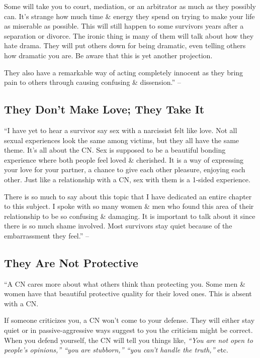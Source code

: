 \documentclass{article}
\numberwithin{equation}{section}
\begin{document}
Some will take you to court, mediation, or an arbitrator as much as they possibly can. It's strange how much time \& energy they spend on trying to make your life as miserable as possible. This will still happen to some survivors years after a separation or divorce. The ironic thing is many of them will talk about how they hate drama. They will put others down for being dramatic, even telling others how dramatic you are. Be aware that this is yet another projection.

They also have a remarkable way of acting completely innocent as they bring pain to others through causing confusing \& dissension.'' -- \cite[pp. 68--69]{Mirza2017}

\subsection{They Don't Make Love; They Take It}
``I have yet to hear a survivor say sex with a narcissist felt like love. Not all sexual experiences look the same among victims, but they all have the same theme. It's all about the CN. Sex is supposed to be a beautiful bonding experience where both people feel loved \& cherished. It is a way of expressing your love for your partner, a chance to give each other pleasure, enjoying each other. Just like a relationship with a CN, sex with them is a 1-sided experience.

There is so much to say about this topic that I have dedicated an entire chapter to this subject. I spoke with so many women \& men who found this area of their relationship to be so confusing \& damaging. It is important to talk about it since there is so much shame involved. Most survivors stay quiet because of the embarrassment they feel.'' -- \cite[p. 69]{Mirza2017}

\subsection{They Are Not Protective}
``A CN cares more about what others think than protecting you. Some men \& women have that beautiful protective quality for their loved ones. This is absent with a CN.

If someone criticizes you, a CN won't come to your defense. They will either stay quiet or in passive-aggressive ways suggest to you the criticism might be correct. When you defend yourself, the CN will tell you things like, \textit{``You are not open to people's opinions,'' ``you are stubborn,'' ``you can't handle the truth,''} etc.
\end{document}
